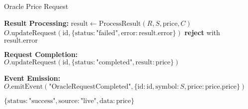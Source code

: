 \begin{tcolorbox}
\begin{protocol}{Oracle Price Request}
\begin{algorithmic}[1]
\State \textbf{Result Processing:}
\State $\text{result} \gets \text{ProcessResult}(R, S, \text{price}, C)$
    \State $O.\text{updateRequest}(\text{id}, \{\text{status}: \text{"failed"}, \text{error}: \text{result}.\text{error}\})$
    \State \textbf{reject} with $\text{result}.\text{error}$
\EndIf

\State \textbf{Request Completion:}
\State $O.\text{updateRequest}(\text{id}, \{\text{status}: \text{"completed"}, \text{result}: \text{price}\})$

\State \textbf{Event Emission:}
\State $O.\text{emitEvent}(\text{"OracleRequestCompleted"}, \{\text{id}: \text{id}, \text{symbol}: S, \text{price}: \text{price}.\text{price}\})$

\State \Return $\{\text{status}: \text{"success"}, \text{source}: \text{"live"}, \text{data}: \text{price}\}$
\end{algorithmic}
\end{protocol}
\end{tcolorbox}
